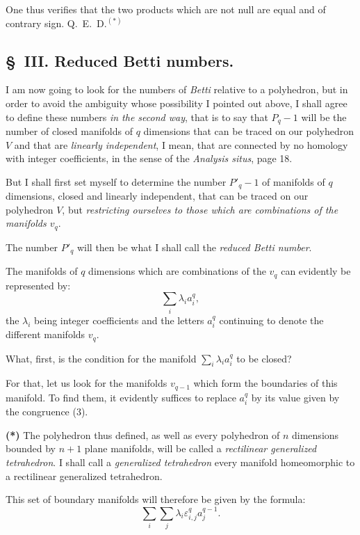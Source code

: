 \documentclass{article}
\begin{document}

One thus verifies that the two products which are not null are equal and of contrary sign. Q.~E.~D.${}^{(*)}$

\subsection*{\S~III. Reduced Betti numbers.}

I am now going to look for the numbers of \emph{Betti} relative to a polyhedron, but in order to avoid the ambiguity whose possibility I pointed out above, I shall agree to define these numbers \emph{in the second way}, that is to say that $P_{q} - 1$ will be the number of closed manifolds of $q$ dimensions that can be traced on our polyhedron $V$ and that are \emph{linearly independent}, I mean, that are connected by no homology with integer coefficients, in the sense of the \emph{Analysis situs}, page 18.

But I shall first set myself to determine the number $P'_{q} - 1$ of manifolds of $q$ dimensions, closed and linearly independent, that can be traced on our polyhedron $V$, but \emph{restricting ourselves to those which are combinations of the manifolds $v_{q}$}.

The number $P'_{q}$ will then be what I shall call the \emph{reduced Betti number}.

The manifolds of $q$ dimensions which are combinations of the $v_{q}$ can evidently be represented by:
\[ \sum_{i} \lambda_{i} a^{q}_{i}, \]
the $\lambda_{i}$ being integer coefficients and the letters $a^{q}_{i}$ continuing to denote the different manifolds $v_{q}$.

What, first, is the condition for the manifold $\displaystyle\sum_{i} \lambda_{i} a^{q}_{i}$ to be closed?

For that, let us look for the manifolds $v_{q-1}$ which form the boundaries of this manifold. To find them, it evidently suffices to replace $a^{q}_{i}$ by its value given by the congruence (3).

\textbf{(*)} The polyhedron thus defined, as well as every polyhedron of $n$ dimensions bounded by $n+1$ plane manifolds, will be called a \emph{rectilinear generalized tetrahedron}. I shall call a \emph{generalized tetrahedron} every manifold homeomorphic to a rectilinear generalized tetrahedron.


This set of boundary manifolds will therefore be given by the formula:
\[ \sum_{i} \sum_{j} \lambda_{i} \varepsilon^{q}_{i,j} a^{q-1}_{j}. \]
\end{document}
